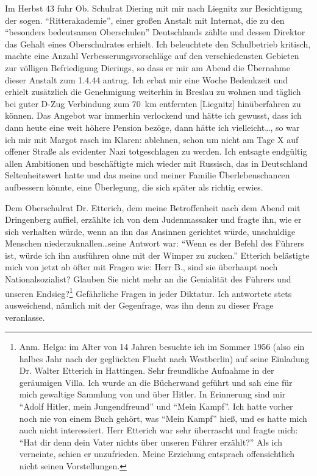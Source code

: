 Im Herbst 43 fuhr Ob. Schulrat Diering mit mir nach Liegnitz zur Besichtigung der sogen. \enquote{Ritterakademie}, einer großen Anstalt mit Internat, die zu den \enquote{besonders bedeutsamen Oberschulen} Deutschlands zählte und dessen Direktor das Gehalt eines Oberschulrates erhielt. Ich beleuchtete den Schulbetrieb kritisch, machte eine Anzahl Verbesserungsvorschläge auf den verschiedensten Gebieten zur völligen Befriedigung Dierings, so dass er mir am Abend die Übernahme dieser Anstalt zum 1.4.44 antrug. Ich erbat mir eine Woche Bedenkzeit und erhielt zusätzlich die Genehmigung weiterhin in Breslau zu wohnen und täglich bei guter D-Zug Verbindung zum 70~km entfernten [Liegnitz] hinüberfahren zu können. Das Angebot  war immerhin verlockend und hätte ich gewusst, dass ich dann heute eine weit höhere Pension bezöge, dann hätte ich vielleicht\dots, so war ich mir mit Margot rasch im Klaren: ablehnen, schon um nicht am Tage X auf offener Straße als evidenter Nazi totgeschlagen zu werden. Ich entsagte endgültig allen Ambitionen und beschäftigte mich wieder mit Russisch, das in Deutschland Seltenheitswert hatte und das meine und meiner Familie Überlebenschancen aufbessern könnte, eine Überlegung, die sich später als richtig erwies.

Dem Oberschulrat Dr. Etterich, dem meine Betroffenheit nach dem Abend mit Dringenberg auffiel, erzählte ich von dem Judenmassaker und fragte ihn, wie er sich verhalten würde, wenn an ihn das Ansinnen gerichtet würde, unschuldige Menschen niederzuknallen\dots seine Antwort war: \enquote{Wenn es der Befehl des Führers ist, würde ich ihn ausführen ohne mit der Wimper zu zucken.} Etterich belästigte mich von jetzt ab öfter mit Fragen wie: Herr B., sind sie überhaupt noch Nationalsozialist? Glauben Sie nicht mehr an die Genialität des Führers und unseren Endsieg?\footnote{Anm. Helga: im Alter von 14 Jahren besuchte ich im Sommer 1956 (also ein halbes Jahr nach der geglückten Flucht nach Westberlin) auf seine Einladung Dr. Walter Etterich in Hattingen. Sehr freundliche Aufnahme in der geräumigen Villa. Ich wurde an die Bücherwand geführt und sah eine für mich gewaltige Sammlung von und über Hitler. In Erinnerung sind mir \enquote{Adolf Hitler, mein Jungendfreund} und \enquote{Mein Kampf}. Ich hatte vorher noch nie von einem Buch gehört, was \enquote{Mein Kampf} hieß, und es hatte mich auch nicht interessiert. Herr Etterich war sehr überrascht und fragte mich: \enquote{Hat dir denn dein Vater nichts über unseren Führer erzählt?} Als ich verneinte, schien er unzufrieden. Meine Erziehung entsprach offensichtlich nicht seinen Vorstellungen.} Gefährliche Fragen in jeder Diktatur. Ich antwortete stets ausweichend, nämlich mit der Gegenfrage, was ihn denn zu dieser Frage veranlasse.

